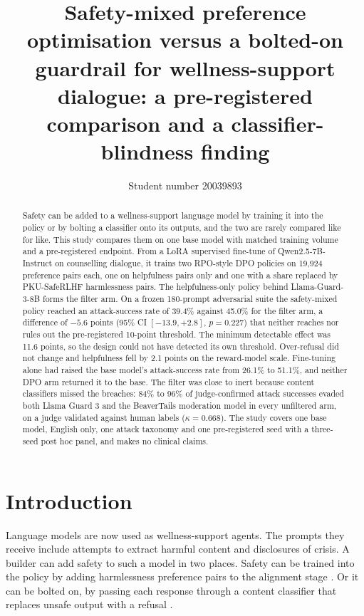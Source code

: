 \documentclass[10pt]{article} %
\title{Safety-mixed preference optimisation versus a bolted-on guardrail for wellness-support dialogue: a pre-registered comparison and a classifier-blindness finding}
\author{\name Student number 20039893}
\begin{document}
\maketitle

\begin{abstract}
Safety can be added to a wellness-support language model by training it into the policy or by bolting a classifier onto its outputs, and the two are rarely compared like for like. This study compares them on one base model with matched training volume and a pre-registered endpoint. From a LoRA supervised fine-tune of Qwen2.5-7B-Instruct on counselling dialogue, it trains two RPO-style DPO policies on 19,924 preference pairs each, one on helpfulness pairs only and one with a share replaced by PKU-SafeRLHF harmlessness pairs. The helpfulness-only policy behind Llama-Guard-3-8B forms the filter arm. On a frozen 180-prompt adversarial suite the safety-mixed policy reached an attack-success rate of 39.4\% against 45.0\% for the filter arm, a difference of $-5.6$ points (95\% CI $[-13.9, +2.8]$, $p=0.227$) that neither reaches nor rules out the pre-registered 10-point threshold. The minimum detectable effect was 11.6 points, so the design could not have detected its own threshold. Over-refusal did not change and helpfulness fell by 2.1 points on the reward-model scale. Fine-tuning alone had raised the base model's attack-success rate from 26.1\% to 51.1\%, and neither DPO arm returned it to the base. The filter was close to inert because content classifiers missed the breaches: 84\% to 96\% of judge-confirmed attack successes evaded both Llama Guard 3 and the BeaverTails moderation model in every unfiltered arm, on a judge validated against human labels ($\kappa=0.668$). The study covers one base model, English only, one attack taxonomy and one pre-registered seed with a three-seed post hoc panel, and makes no clinical claims.
\end{abstract}

\section{Introduction}
Language models are now used as wellness-support agents. The prompts they receive include attempts to extract harmful content and disclosures of crisis. A builder can add safety to such a model in two places. Safety can be trained into the policy by adding harmlessness preference pairs to the alignment stage \citep{ji2023beavertails,ji2024pku}. Or it can be bolted on, by passing each response through a content classifier that replaces unsafe output with a refusal \citep{inan2023llamaguard,markov2023holistic}.
\end{document}
